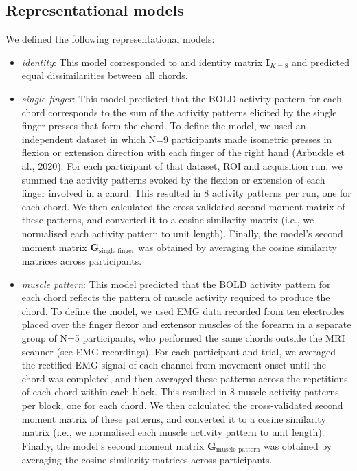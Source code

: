 \documentclass{article}
\begin{document}
\subsection{Representational models}

We defined the following representational models:
\begin{itemize}
    \item \textit{identity}: This model corresponded to and identity matrix $\mathbf{I}_{K=8}$ and predicted equal dissimilarities between all chords.
    \item \textit{single finger}: This model predicted that the BOLD activity pattern for each chord corresponds to the sum of the activity patterns elicited by the single finger presses that form the chord. To define the model, we used an independent dataset in which N=9 participants made isometric presses in flexion or extension direction with each finger of the right hand (Arbuckle et al., 2020). For each participant of that dataset, ROI and acquisition run, we summed the activity patterns evoked by the flexion or extension of each finger involved in a chord. This resulted in 8 activity patterns per run, one for each chord. We then calculated the cross-validated second moment matrix of these patterns, and converted it to a cosine similarity matrix (i.e., we normalised each activity pattern to unit length). Finally, the model's second moment matrix $\mathbf{G}_{\text{single finger}}$ was obtained by averaging the cosine similarity matrices across participants.
    \item \textit{muscle pattern}: This model predicted that the BOLD activity pattern for each chord reflects the pattern of muscle activity required to produce the chord. To define the model, we used EMG data recorded from ten electrodes placed over the finger flexor and extensor muscles of the forearm in a separate group of N=5 participants, who performed the same chords outside the MRI scanner (see EMG recordings). For each participant and trial, we averaged the rectified EMG signal of each channel from movement onset until the chord was completed, and then averaged these patterns across the repetitions of each chord within each block. This resulted in 8 muscle activity patterns per block, one for each chord. We then calculated the cross-validated second moment matrix of these patterns, and converted it to a cosine similarity matrix (i.e., we normalised each muscle activity pattern to unit length). Finally, the model's second moment matrix $\mathbf{G}_{\text{muscle pattern}}$ was obtained by averaging the cosine similarity matrices across participants.

\end{itemize}
\end{document}

